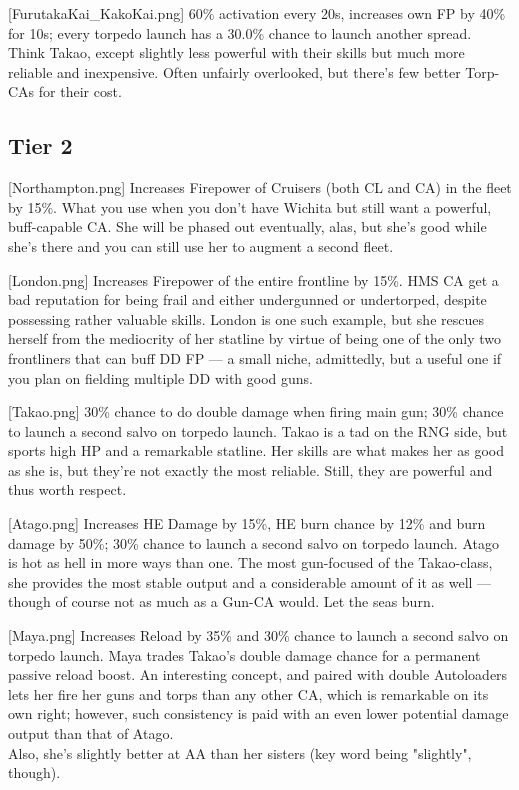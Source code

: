 [FurutakaKai_KakoKai.png]
{60\% activation every 20s, increases own FP by 40\% for 10s; every torpedo launch has a 30.0\% chance to launch another spread.}
{}
{Think Takao, except slightly less powerful with their skills but much more reliable and inexpensive. Often unfairly overlooked, but there's few better Torp-CAs for their cost.}

 
\newpage
\subsection{Tier 2}
[Northampton.png]
{Increases Firepower of Cruisers (both CL and CA) in the fleet by 15\%.}
{}
{What you use when you don't have Wichita but still want a powerful, buff-capable CA. She will be phased out eventually, alas, but she's good while she's there and you can still use her to augment a second fleet.}

[London.png]
{Increases Firepower of the entire frontline by 15\%.}
{}
{HMS CA get a bad reputation for being frail and either undergunned or undertorped, despite possessing rather valuable skills. London is one such example, but she rescues herself from the mediocrity of her statline by virtue of being one of the only two frontliners that can buff DD FP --- a small niche, admittedly, but a useful one if you plan on fielding multiple DD with good guns.}

[Takao.png]
{30\% chance to do double damage when firing main gun; 30\% chance to launch a second salvo on torpedo launch.}
{}
{Takao is a tad on the RNG side, but sports high HP and a remarkable statline. Her skills are what makes her as good as she is, but they're not exactly the most reliable. Still, they are powerful and thus worth respect.}

[Atago.png]
{Increases HE Damage by 15\%, HE burn chance by 12\% and burn damage by 50\%; 30\% chance to launch a second salvo on torpedo launch.}
{}
{Atago is hot as hell in more ways than one. The most gun-focused of the Takao-class, she provides the most stable output and a considerable amount of it as well --- though of course not as much as a Gun-CA would. Let the seas burn.}

[Maya.png]
{Increases Reload by 35\% and 30\% chance to launch a second salvo on torpedo launch.}
{}
{Maya trades Takao's double damage chance for a permanent passive reload boost. An interesting concept, and paired with double Autoloaders lets her fire her guns and torps than any other CA, which is remarkable on its own right; however, such consistency is paid with an even lower potential damage output than that of Atago.\\
Also, she's slightly better at AA than her sisters (key word being "slightly", though).}


